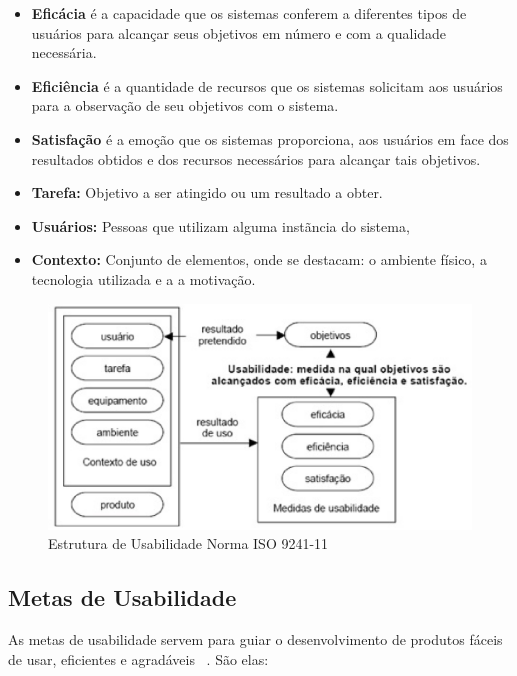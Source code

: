 \begin{itemize}
\item \textbf{Eficácia} é a capacidade que os sistemas conferem a diferentes tipos de usuários para alcançar seus objetivos em número e com a qualidade necessária. 
\item \textbf{Eficiência} é a quantidade de recursos que os sistemas solicitam aos usuários para a observação de seu objetivos com o sistema.
\item \textbf{Satisfação} é a emoção que os sistemas proporciona, aos usuários em face dos resultados obtidos e dos recursos necessários para alcançar tais objetivos. 
\item \textbf{Tarefa:} Objetivo a ser atingido ou um resultado a obter.
\item \textbf{Usuários:} Pessoas que utilizam alguma instãncia do sistema,
\item \textbf{Contexto:} Conjunto de elementos, onde se destacam: o ambiente físico, a tecnologia utilizada e a a motivação.
\end{itemize}


\begin{figure}[h]
    \centering
    \includegraphics[keepaspectratio=true,scale=0.60]
      {figuras/estruturausabilidade9241.eps}
    \caption{Estrutura de Usabilidade Norma ISO 9241-11 ~\cite{iso9241-11}}
    \label{estrutura_usabilidade}
\end{figure}

\subsection{Metas de Usabilidade}

	As metas de usabilidade servem para guiar o desenvolvimento de produtos fáceis de usar, eficientes e agradáveis ~\cite{preece2007}. São elas:

